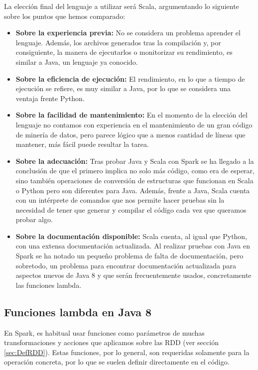 La elección final del lenguaje a utilizar será Scala, argumentando lo siguiente sobre los puntos que hemos comparado:

\begin{itemize}
	\item \textbf{Sobre la experiencia previa:} No se considera un problema aprender el lenguaje. Además, los archivos generados tras la compilación y, por consiguiente, la manera de ejecutarlos o monitorizar su rendimiento, es similar a Java, un lenguaje ya conocido.
	\item \textbf{Sobre la eficiencia de ejecución:} El rendimiento, en lo que a tiempo de ejecución se refiere, es muy similar a Java, por lo que se considera una ventaja frente Python.
	\item \textbf{Sobre la facilidad de mantenimiento:} En el momento de la elección del lenguaje no contamos con experiencia en el mantenimiento de un gran código de minería de datos, pero parece lógico que a menos cantidad de líneas que mantener, más fácil puede resultar la tarea.	
	\item \textbf{Sobre la adecuación:} Tras probar Java y Scala con Spark se ha llegado a la conclusión de que el primero implica no solo más código, como era de esperar, sino también operaciones de conversión de estructuras que funcionan en Scala o Python pero son diferentes para Java. Además, frente a Java, Scala cuenta con un intérprete de comandos que nos permite hacer pruebas sin la necesidad de tener que generar y compilar el código cada vez que queramos probar algo.
	\item \textbf{Sobre la documentación disponible:} Scala cuenta, al igual que Python, con una extensa documentación actualizada. Al realizar pruebas con Java en Spark se ha notado un pequeño problema de falta de documentación, pero sobretodo, un problema para encontrar documentación actualizada para aspectos nuevos de Java 8 y que serán frecuentemente usados, concretamente las funciones lambda.
\end{itemize}

\newpage
\subsection{Funciones lambda en Java 8 } \label{subsec:ExplLambdaJava}

En Spark, es habitual usar funciones como parámetros de muchas transformaciones y acciones que aplicamos sobre las RDD (ver sección \ref{sec:DefRDD}). Estas funciones, por lo general, son requeridas solamente para la operación concreta, por lo que se suelen definir directamente en el código.

